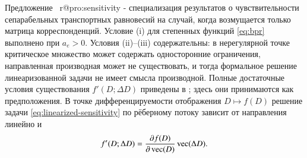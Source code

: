 \documentclass{crm-article}
\makeatletter
\def\CRMfirstoffields#1#2#3\null{#1}
\renewcommand{\ref}[1]{%
  \expandafter\let\expandafter\CRMreftemp\csname r@#1\endcsname
  \@setref\CRMreftemp\CRMfirstoffields{#1}}
\makeatother
\begin{document}
Предложение~\ref{pro:sensitivity} --- специализация результатов
\cite{JosefssonPatriksson2007} о чувствительности сепарабельных транспортных
равновесий на случай, когда возмущается только матрица корреспонденций. Условие {\rm(i)} для степенных функций \eqref{eq:bpr} выполнено
при $a_e>0$. Условия {\rm(ii)}--{\rm(iii)} содержательны: в нерегулярной
точке критическое множество может содержать односторонние ограничения,
направленная производная может не существовать, и тогда формальное решение
линеаризованной задачи не имеет смысла производной. Полные достаточные
условия существования $f'(D;\Delta D)$ приведены в
\cite{JosefssonPatriksson2007}; здесь они принимаются как предположения. В точке дифференцируемости отображения $D\mapsto f(D)$ решение
задачи \eqref{eq:linearized-sensitivity} по рёберному потоку зависит от
направления линейно и
\begin{gather}
 f'(D;\Delta D)=
 \frac{\partial f(D)}{\partial\mathop{\rm vec}(D)}
 \mathop{\rm vec}(\Delta D).
 \label{eq:directional-jacobian}
\end{gather}
\end{document}
